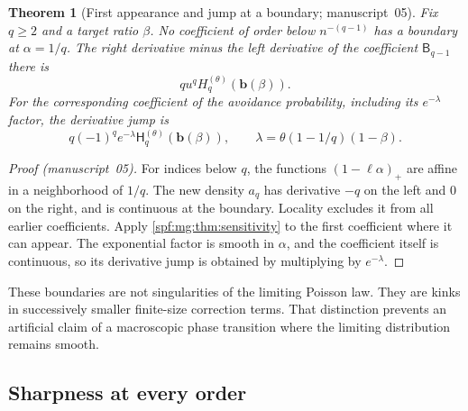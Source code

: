 \documentclass[11pt]{article}
\numberwithin{equation}{section}
\newtheorem{theorem}{Theorem}[section]
\theoremstyle{definition}
\theoremstyle{remark}
\theoremstyle{definition}
\newcommand{\mgb}{\boldsymbol b}
\begin{document}
\begin{theorem}[First appearance and jump at a boundary; manuscript~05]
\label{spf:mg:thm:boundary}
Fix $q\ge2$ and a target ratio $\beta$. No coefficient of order below
$n^{-(q-1)}$ has a boundary at $\alpha=1/q$. The right derivative minus
the left derivative of the coefficient $\mathsf B_{q-1}$ there is
\begin{equation}
 q u^qH_q^{(\theta)}(\mgb(\beta)).
 \label{spf:mg:eq:boundary-jump}
\end{equation}
For the corresponding coefficient of the avoidance probability,
including its $e^{-\lambda}$ factor, the derivative jump is
\begin{equation}
 q(-1)^q e^{-\lambda}\mathsf H_q^{(\theta)}(\mgb(\beta)),
 \qquad\lambda=\theta(1-1/q)(1-\beta).
 \label{spf:mg:eq:avoid-jump}
\end{equation}
\end{theorem}
\begin{proof}[Proof (manuscript~05)]
For indices below $q$, the functions $(1-\ell\alpha)_+$ are affine in
a neighborhood of $1/q$. The new density $a_q$ has derivative $-q$
on the left and $0$ on the right, and is continuous at the boundary.
Locality excludes it from all earlier coefficients. Apply
\cref{spf:mg:thm:sensitivity} to the first coefficient where it can appear.
The exponential factor is smooth in $\alpha$, and the coefficient itself
is continuous, so its derivative jump is obtained by multiplying by
$e^{-\lambda}$.
\end{proof}

These boundaries are not singularities of the limiting Poisson law.
They are kinks in successively smaller finite-size correction terms.
That distinction prevents an artificial claim of a macroscopic phase
transition where the limiting distribution remains smooth.

\subsection{Sharpness at every order}
\end{document}
